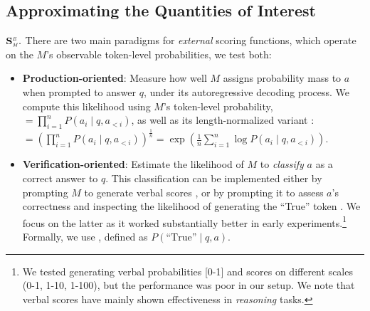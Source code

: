 \subsection{Approximating the Quantities of Interest}
\label{sec:estimation_instantiation}



$\mathbf{S_{\text{\tiny \emph{M}}}^{\text{\tiny \emph{E}}}}.$
There are two main paradigms for \emph{external} scoring functions, which operate on the $M$'s observable token-level probabilities, we test both:

\vspace{-2.5pt}
\begin{itemize}

    \item \textbf{Production-oriented}:
    Measure how well $M$ assigns probability mass to $a$ when prompted to answer $q$, under its autoregressive decoding process. We compute this likelihood using $M$'s token-level probability, \baselineA$ = \prod_{i=1}^{n} P(a_i \mid q, a_{<i})$, as well as its length-normalized variant \citep{brown2020nips,wang2023selfconsistency}: \baselineB$ = \left( \prod_{i=1}^{n} P(a_i \mid q, a_{<i}) \right)^{\frac{1}{n}} = \exp \left( \frac{1}{n} \sum_{i=1}^{n} \log P(a_i \mid q, a_{<i}) \right)$.


    \item \textbf{Verification-oriented}: Estimate the likelihood of $M$ to \textit{classify} $a$ as a correct answer to $q$. This classification can be implemented either by prompting $M$ to generate verbal scores
    \citep{lin2022tmlr,tian2023emnlp}, or by prompting it to assess $a$'s correctness and inspecting the likelihood of generating the ``True'' token \citep{kadavath2022language}. We focus on the latter as it worked substantially better in early experiments.\footnote{We tested generating verbal probabilities [0-1] and scores on different scales (0-1, 1-10, 1-100), but the performance was poor in our setup. We note that verbal scores have mainly shown effectiveness in \textit{reasoning} tasks.} Formally, we use  \baselineC, defined as $P(\text{``True''} \mid q, a)$.
\end{itemize}
\vspace{-2.5pt}

